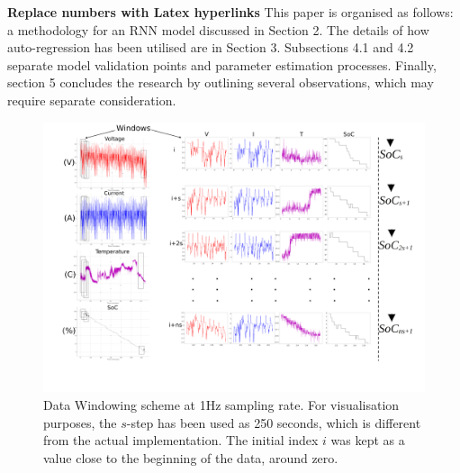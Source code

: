 %
%
\textbf{Replace numbers with Latex hyperlinks}
This paper is organised as follows: a methodology for an RNN model discussed in Section 2.
The details of how auto-regression has been utilised are in Section 3.
Subsections 4.1 and 4.2 separate model validation points and parameter estimation processes.
Finally, section 5 concludes the research by outlining several observations, which may require separate consideration.
\begin{landscape}
    \begin{figure}[ht]
        \centering
        \includegraphics[width=0.9\linewidth]{II_Body/images/Windowing4f-A3.jpg}
        \caption{Data Windowing scheme at 1Hz sampling rate. For visualisation purposes, the $s$-step has been used as 250 seconds, which is different from the actual implementation. The initial index $i$ was kept as a value close to the beginning of the data, around zero.}
        \label{fig:Windowing}
    \end{figure}
\end{landscape}